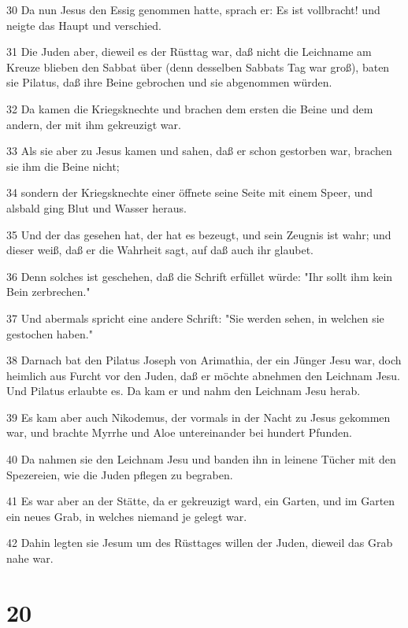 \par 30 Da nun Jesus den Essig genommen hatte, sprach er: Es ist vollbracht! und neigte das Haupt und verschied.
\par 31 Die Juden aber, dieweil es der Rüsttag war, daß nicht die Leichname am Kreuze blieben den Sabbat über (denn desselben Sabbats Tag war groß), baten sie Pilatus, daß ihre Beine gebrochen und sie abgenommen würden.
\par 32 Da kamen die Kriegsknechte und brachen dem ersten die Beine und dem andern, der mit ihm gekreuzigt war.
\par 33 Als sie aber zu Jesus kamen und sahen, daß er schon gestorben war, brachen sie ihm die Beine nicht;
\par 34 sondern der Kriegsknechte einer öffnete seine Seite mit einem Speer, und alsbald ging Blut und Wasser heraus.
\par 35 Und der das gesehen hat, der hat es bezeugt, und sein Zeugnis ist wahr; und dieser weiß, daß er die Wahrheit sagt, auf daß auch ihr glaubet.
\par 36 Denn solches ist geschehen, daß die Schrift erfüllet würde: "Ihr sollt ihm kein Bein zerbrechen."
\par 37 Und abermals spricht eine andere Schrift: "Sie werden sehen, in welchen sie gestochen haben."
\par 38 Darnach bat den Pilatus Joseph von Arimathia, der ein Jünger Jesu war, doch heimlich aus Furcht vor den Juden, daß er möchte abnehmen den Leichnam Jesu. Und Pilatus erlaubte es. Da kam er und nahm den Leichnam Jesu herab.
\par 39 Es kam aber auch Nikodemus, der vormals in der Nacht zu Jesus gekommen war, und brachte Myrrhe und Aloe untereinander bei hundert Pfunden.
\par 40 Da nahmen sie den Leichnam Jesu und banden ihn in leinene Tücher mit den Spezereien, wie die Juden pflegen zu begraben.
\par 41 Es war aber an der Stätte, da er gekreuzigt ward, ein Garten, und im Garten ein neues Grab, in welches niemand je gelegt war.
\par 42 Dahin legten sie Jesum um des Rüsttages willen der Juden, dieweil das Grab nahe war.

\chapter{20}

